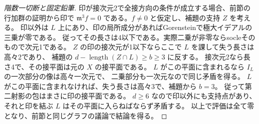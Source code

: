 \begin{proof}[階数一切断と固定鉛筆]
印が接次元2で全接方向の条件が成立する場合、前節の行加群の証明から印で
$\mathfrak m^3 f=0$ である。$f\ne0$ と仮定し、補題の支持 $Z$ を考える。
印以外は $L$ 上にあり、印の局所成分があればGorensteinで極大イデアルの三乗が零である。
従ってその長さは4以下である。実際二乗が非零ならsocleそのもので次元1である。
$Z$ の印の接次元が1以下ならここで $L$ を課して失う長さは高々2であり、
補題の $d-\operatorname{length}(Z\cap L)\ge b\ge3$ に反する。
接次元2なら長さ4で、その接平面は元の $X$ の接平面である。
$L$ がこの平面に含まれるなら $I_L$ の一次部分の像は高々一次元で、
二乗部分も一次元なので同じ矛盾を得る。
$L$ がこの平面に含まれなければ、失う長さは高々3で、補題から $b=3$。
従って第二射影の包はまさに印の接平面である。
$d\ge6$ なので印以外にも支持点があり、それと印を結ぶ $L$ はその平面に入らねばならず矛盾する。
以上で評価は全て零となり、前節と同じグラフの議論で結論を得る。
\end{proof}
